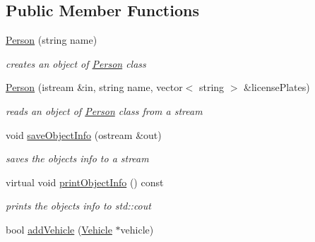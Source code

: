 \subsection*{Public Member Functions}
\begin{DoxyCompactItemize}
\item 
\hypertarget{class_person_aba0adcb7be258cfdda603c6261a61985}{}\hyperlink{class_person_aba0adcb7be258cfdda603c6261a61985}{Person} (string name)\label{class_person_aba0adcb7be258cfdda603c6261a61985}

\begin{DoxyCompactList}\small\item\em creates an object of \hyperlink{class_person}{Person} class \end{DoxyCompactList}\item 
\hyperlink{class_person_a748e7012f90b5d9666687b15a4b5bd7f}{Person} (istream \&in, string name, vector$<$ string $>$ \&license\+Plates)
\begin{DoxyCompactList}\small\item\em reads an object of \hyperlink{class_person}{Person} class from a stream \end{DoxyCompactList}\item 
\hypertarget{class_person_aba5495c75e9294a1dcd7a0624d8f7fc2}{}void \hyperlink{class_person_aba5495c75e9294a1dcd7a0624d8f7fc2}{save\+Object\+Info} (ostream \&out)\label{class_person_aba5495c75e9294a1dcd7a0624d8f7fc2}

\begin{DoxyCompactList}\small\item\em saves the objects\textquotesingle{} info to a stream \end{DoxyCompactList}\item 
\hypertarget{class_person_a7f14c8d2bc2b51b3304085689b021b33}{}virtual void \hyperlink{class_person_a7f14c8d2bc2b51b3304085689b021b33}{print\+Object\+Info} () const \label{class_person_a7f14c8d2bc2b51b3304085689b021b33}

\begin{DoxyCompactList}\small\item\em prints the objects\textquotesingle{} info to std\+::cout \end{DoxyCompactList}\item 
\hypertarget{class_person_a3776df9441e6a8f7165948d893e2c027}{}bool \hyperlink{class_person_a3776df9441e6a8f7165948d893e2c027}{add\+Vehicle} (\hyperlink{class_vehicle}{Vehicle} $\ast$vehicle)\label{class_person_a3776df9441e6a8f7165948d893e2c027}


\end{DoxyCompactItemize}
